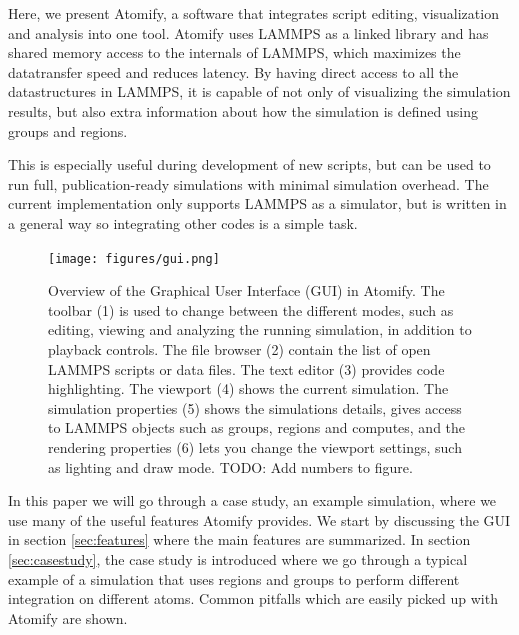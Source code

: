 \documentclass[12pt,a4paper,final]{iopart}
\begin{document}
Here, we present Atomify, a software that integrates script editing,
visualization and analysis into one tool.
Atomify uses LAMMPS as a linked library and has shared memory access to the internals of LAMMPS,
which maximizes the datatransfer speed and reduces latency.
By having direct access to all the datastructures in LAMMPS, it is capable of not only of visualizing the simulation results,
but also extra information about how the simulation is defined using groups and regions.

This is especially useful during development of new scripts, but can be used
to run full, publication-ready simulations with minimal simulation overhead.
The current implementation only supports LAMMPS as a simulator, but is written in a general
way so integrating other codes is a simple task.

\begin{figure}
	\centering
	\texttt{[image: figures/gui.png]}
	\caption{%
    Overview of the Graphical User Interface (GUI) in Atomify.
    The toolbar (1) is used to change between the different modes, such as
    editing, viewing and analyzing the running simulation,
    in addition to playback controls.
    The file browser (2) contain the list of open LAMMPS scripts or data files.
    The text editor (3) provides code highlighting.
    The viewport (4) shows the current simulation.
    The simulation properties (5) shows the simulations details, gives access to
    LAMMPS objects such as groups, regions and computes, and the rendering
    properties (6) lets you change the viewport settings, such as lighting and
    draw mode.
    TODO: Add numbers to figure.
    }
	\label{fig:gui}
\end{figure}

In this paper we will go through a case study, an example simulation, where we
use many of the useful features Atomify provides.
We start by discussing the GUI in section \ref{sec:features} where the main features are summarized.
In section \ref{sec:casestudy}, the case study is introduced where we go through a typical example
of a simulation that uses regions and groups to perform different integration on different atoms.
Common pitfalls which are easily picked up with Atomify are shown.
\end{document}
